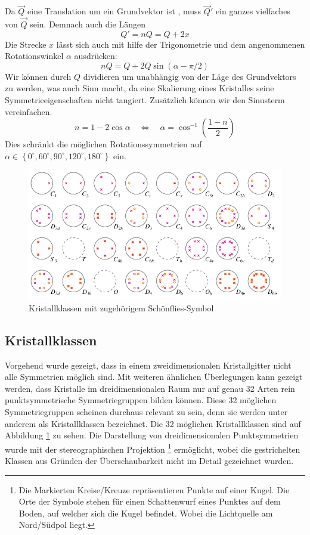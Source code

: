  Da \(\vec{Q}\) eine Translation um ein Grundvektor ist , muss \(\vec{Q}'\) ein ganzes vielfaches von \(\vec{Q}\) sein.
 Demnach auch die Längen
 \[
    Q' = nQ = Q + 2x
 \]
 Die Strecke \(x\) lässt sich auch mit hilfe der Trigonometrie und dem angenommenen Rotationswinkel \(\alpha\) ausdrücken:
 \[
    nQ = Q + 2Q\sin(\alpha - \pi/2)
 \]
 Wir können durch \(Q\) dividieren um unabhängig von der Läge des Grundvektors zu werden, was auch Sinn macht, 
 da eine Skalierung eines Kristalles seine Symmetrieeigenschaften nicht tangiert.
 Zusätzlich können wir den Sinusterm vereinfachen.
 \[
     n = 1 - 2\cos\alpha \quad\iff\quad
     \alpha = \cos^{-1}\left(\frac{1-n}{2}\right)
 \]
 Dies schränkt die möglichen Rotationssymmetrien auf 
 \(
     \alpha \in \left\{ 0^\circ, 60^\circ, 90^\circ, 120^\circ, 180^\circ\right\}
 \)
ein.

\begin{figure}
    \centering
    \includegraphics[]{papers/punktgruppen/figures/projections}
    \caption{Kristallklassen mit zugehörigem Schönflies-Symbol}
    \label{fig:punktgruppen:Kristallkassen}
\end{figure}

\subsection{Kristallklassen}
Vorgehend wurde gezeigt, dass in einem zweidimensionalen Kristallgitter nicht alle Symmetrien möglich sind.
Mit weiteren ähnlichen Überlegungen kann gezeigt werden, dass Kristalle im dreidimensionalen Raum
nur auf genau 32 Arten rein punktsymmetrische
Symmetriegruppen bilden können.
Diese 32 möglichen Symmetriegruppen scheinen durchaus relevant zu sein, denn sie werden unter anderem als Kristallklassen bezeichnet.
Die 32 möglichen Kristallklassen sind auf Abbildung \ref{fig:punktgruppen:Kristallkassen} zu sehen.
Die Darstellung von dreidimensionalen Punktsymmetrien wurde mit der stereographischen Projektion
\footnote{Die Markierten Kreise/Kreuze repräsentieren Punkte auf einer Kugel. 
Die Orte der Symbole stehen für einen Schattenwurf eines Punktes auf dem Boden, auf welcher sich die Kugel befindet.
Wobei die Lichtquelle am Nord/Südpol liegt.} 
ermöglicht, 
wobei die gestrichelten Klassen aus Gründen der Überschaubarkeit nicht im Detail gezeichnet wurden. 


